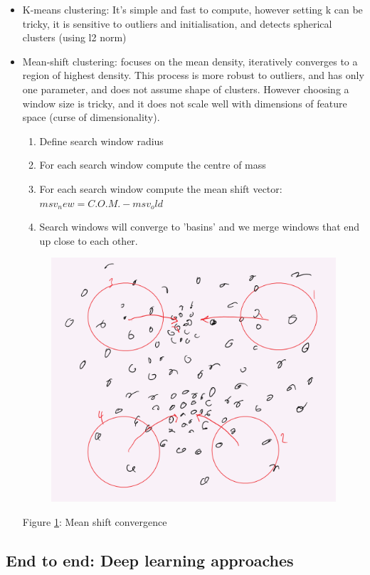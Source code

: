 \documentclass[]{article}
\begin{document}
			\begin{itemize}
				\item K-means clustering: It's simple and fast to compute, however setting k can be tricky, it is sensitive to outliers and initialisation, and detects spherical clusters (using l2 norm)
				\item Mean-shift clustering: focuses on the mean density, iteratively converges to a region of highest density. This process is more robust to outliers, and has only one parameter, and does not assume shape of clusters. However choosing a window size is tricky, and it does not scale well with dimensions of feature space (curse of dimensionality).
				
				\begin{enumerate}
					\item Define search window radius
					\item For each search window compute the centre of mass
					\item For each search window compute the mean shift vector: $msv_new = C.O.M. - msv_old$ 
					\item Search windows will converge to 'basins' and we merge windows that end up close to each other.
				\end{enumerate}
			\newpage
			\begin{figure}[h!]
				\begin{center}
					\includegraphics[width=0.5\linewidth]{./images/meanshift.PNG}
					\label{fig:ms}
				\end{center}
			\end{figure}
			
			\begin{center}
				Figure \ref{fig:ms}: Mean shift convergence
			\end{center}
			\end{itemize}
	
	\subsection{End to end: Deep learning approaches}
	
\end{document}
